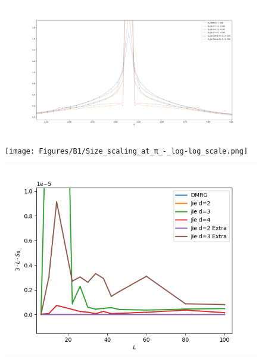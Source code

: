 \documentclass[10pt,a4paper,twoside,twocolumn]{revtex4-1}
\begin{document}
\begin{figure}[H]
  \centerline{
\includegraphics[width=1.\linewidth]{Figures/B1/Struncture_factor-zoom.png}}
  \label{Fig:Structure-factor-total-B1}
\end{figure}
\begin{figure}[H]
  \centerline{
\texttt{[image: Figures/B1/Size\_scaling\_at\_π\_-\_log-log\_scale.png]}}
  \label{Fig:Structure-factor-pi-B1}
\end{figure}
\begin{figure}[H]
  \centerline{
\includegraphics[width=1.\linewidth]{Figures/B1/Size_scaling_at_0.png}}
  \label{Fig:Structure-factor-0-B1}
\end{figure}
\end{document}
